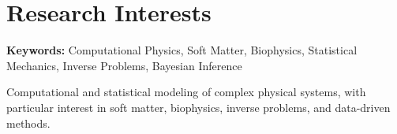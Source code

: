 \section{Research Interests}

\textbf{Keywords:}
Computational Physics, Soft Matter, Biophysics, Statistical Mechanics,
Inverse Problems, Bayesian Inference

\vspace{0.15em}

{\small
Computational and statistical modeling of complex physical systems, with
particular interest in soft matter, biophysics, inverse problems, and
data-driven methods.
}